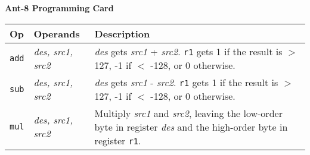\documentclass[10pt]{report}
\begin{document}
\begin{center}
{\LARGE\bf {\sc Ant-8}  Programming Card}
\end{center}

\vspace{3mm}
\noindent
\begin{tabular}{|ll|p{4.5in}|}
\hline
        {\bf Op}        & {\bf Operands}        & {\bf Description}     \\
\hline
\hline
        {\tt add}       & {\em des, src1, src2} &
                {\em des} gets {\em src1} + {\em src2}.
                {\tt r1} gets 1 if the result is $>$ 127,
		-1 if $<$ -128, or 0 otherwise. \\
\hline
        {\tt sub}       & {\em des, src1, src2} &
                {\em des} gets {\em src1} - {\em src2}.
                {\tt r1} gets 1 if the result is $>$ 127,
		-1 if $<$ -128, or 0 otherwise. \\
\hline
        {\tt mul}       & {\em des, src1, src2} &
                Multiply {\em src1} and {\em src2},
                leaving the low-order byte in register {\em des}
                and the high-order byte in register {\tt r1}. \\


\end{tabular}
\end{document}
